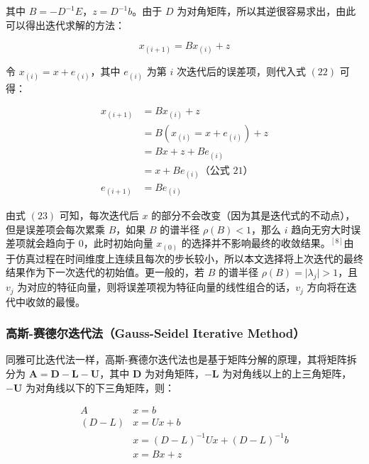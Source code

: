 \documentclass[UTF8]{ctexart}
\begin{document}
其中 $B = -D^{-1} E$，$z = D^{-1}b$。由于 $D$ 为对角矩阵，所以其逆很容易求出，由此可以得出迭代求解的方法：

\begin{large}
\begin{equation}
x_{(i+1)} = Bx_{(i)} + z
\end{equation}
\end{large}

令 $x_{(i)} = x + e_{(i)}$，其中 $e_{(i)}$ 为第 $i$ 次迭代后的误差项，则代入式 $(22)$ 可得：

\begin{large}
\begin{equation}
\begin{split}
x_{(i+1)} &= Bx_{(i)} + z \\
&= B(x_{(i)} = x + e_{(i)}) + z \\
&= Bx + z + Be_{(i)} \\
&= x + Be_{(i)} \text{（公式 21）} \\
e_{(i+1)} &= Be_{(i)}
\end{split}
\end{equation}
\end{large}

由式 $(23)$ 可知，每次迭代后 $x$ 的部分不会改变（因为其是迭代式的不动点），但是误差项会每次累乘 $B$，如果 $B$ 的谱半径 $\rho (B) < 1$，那么 $i$ 趋向无穷大时误差项就会趋向于 $0$，此时初始向量 $x_{(0)}$ 的选择并不影响最终的收敛结果。${}^{[8]}$由于仿真过程在时间维度上连续且每次的步长较小，所以本文选择将上次迭代的最终结果作为下一次迭代的初始值。更一般的，若 $B$ 的谱半径 $\rho (B) = \lvert \lambda_{j} \rvert > 1$，且 $v_j$ 为对应的特征向量，则将误差项视为特征向量的线性组合的话，$v_j$ 方向将在迭代中收敛的最慢。

\subsubsection {高斯-赛德尔迭代法（Gauss-Seidel Iterative Method）}

同雅可比迭代法一样，高斯-赛德尔迭代法也是基于矩阵分解的原理，其将矩阵拆分为 $\mathbf{A = D - L - U}$，其中 $\mathbf{D}$ 为对角矩阵，$\mathbf{-L}$ 为对角线以上的上三角矩阵，$\mathbf{-U}$ 为对角线以下的下三角矩阵，则：

\begin{large}
\begin{equation}
\begin{split}
A&x = b \\
(D - L)&x = Ux + b \\
&x =  (D - L)^{-1} Ux + (D - L)^{-1} b \\ 
&x = Bx + z
\end{split}
\end{equation}
\end{large}
\end{document}
